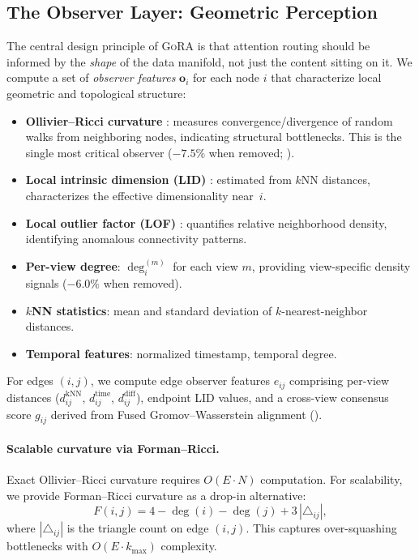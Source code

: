 \documentclass[11pt,a4paper]{article}
\newcommand{\ours}{\textsc{GoRA}}  %
\begin{document}
\subsection{The Observer Layer: Geometric Perception}
\label{sec:observers}

The central design principle of \ours{} is that attention routing
should be informed by the \emph{shape} of the data manifold, not just
the content sitting on it.
We compute a set of \emph{observer features} $\mathbf{o}_i$ for each
node $i$ that characterize local geometric and topological structure:

\begin{itemize}[nosep]
  \item \textbf{Ollivier--Ricci curvature} \citep{ollivier2009ricci}:
    measures convergence/divergence of random walks from neighboring
    nodes, indicating structural bottlenecks.
    This is the single most critical observer ($-7.5\%$ when removed;
    ).
  \item \textbf{Local intrinsic dimension (LID)}
    \citep{levina2004maximum}: estimated from $k$NN distances,
    characterizes the effective dimensionality near~$i$.
  \item \textbf{Local outlier factor (LOF)} \citep{breunig2000lof}:
    quantifies relative neighborhood density, identifying anomalous
    connectivity patterns.
  \item \textbf{Per-view degree}: $\deg_i^{(m)}$ for each view $m$,
    providing view-specific density signals ($-6.0\%$ when removed).
  \item \textbf{$k$NN statistics}: mean and standard deviation of
    $k$-nearest-neighbor distances.
  \item \textbf{Temporal features}: normalized timestamp, temporal
    degree.
\end{itemize}

For edges $(i, j)$, we compute edge observer features
$e_{ij}$ comprising per-view distances
($d_{ij}^{\text{kNN}}$, $d_{ij}^{\text{time}}$,
$d_{ij}^{\text{diff}}$), endpoint LID values, and a cross-view
consensus score $g_{ij}$ derived from Fused Gromov--Wasserstein
alignment ().

\paragraph{Scalable curvature via Forman--Ricci.}
Exact Ollivier--Ricci curvature requires $O(E \cdot N)$ computation.
For scalability, we provide Forman--Ricci curvature
\citep{forman2003bochner} as a drop-in alternative:
\begin{equation}
  \label{eq:forman}
  F(i, j) = 4 - \deg(i) - \deg(j) + 3\,|\triangle_{ij}|,
\end{equation}
where $|\triangle_{ij}|$ is the triangle count on edge $(i, j)$.
This captures over-squashing bottlenecks
\citep{topping2022understanding} with $O(E \cdot k_{\max})$ complexity.
\end{document}
